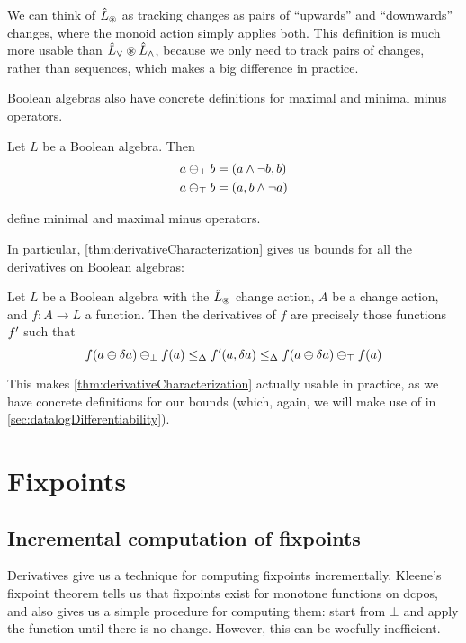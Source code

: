 We can think of $\hat{L}_\circledast$ as tracking changes as pairs of ``upwards'' and
``downwards'' changes, where the monoid action simply applies both. This
definition is much more usable than $\hat{L}_\vee \circledast \hat{L}_\wedge$, because we
only need to track pairs of changes, rather than sequences, which makes a big
difference in practice.

Boolean algebras also have concrete definitions for maximal and minimal minus
operators.

\begin{prop}
  Let $L$ be a Boolean algebra. Then
  \begin{align*}
    a \ominus_\bot b &= (a \wedge \neg b, b)\\
    a \ominus_\top b &= (a, b \wedge \neg a)
  \end{align*}

  define minimal and maximal minus operators.
\end{prop}

In particular, \cref{thm:derivativeCharacterization} gives us bounds for
all the derivatives on Boolean algebras:

\begin{corollary}
\label{cor:booleanCharacterization}
  Let $L$ be a Boolean algebra with the $\hat{L}_\circledast$ change action, $A$ be
  a change action, and $f: A \rightarrow
  L$ a function. Then the derivatives of $f$ are precisely those functions
  $f'$ such that
  $$
  f(a \oplus \delta a) \ominus_\bot f(a)
  \leq_\Delta
  f'(a, \delta a)
  \leq_\Delta
  f(a \oplus \delta a) \ominus_\top f(a)
  $$
\end{corollary}

This makes \cref{thm:derivativeCharacterization} actually usable in practice, as
we have concrete definitions for our bounds (which, again, we will make use of in \cref{sec:datalogDifferentiability}).

\section{Fixpoints}
\label{sec:fixpoints}

\subsection{Incremental computation of fixpoints}

Derivatives give us a technique for computing fixpoints incrementally. Kleene's
fixpoint theorem tells us that fixpoints exist for monotone functions on dcpos, and also gives us
a simple procedure for computing them: start from $\bot$ and apply the function
until there is no change. However, this can be woefully inefficient.

